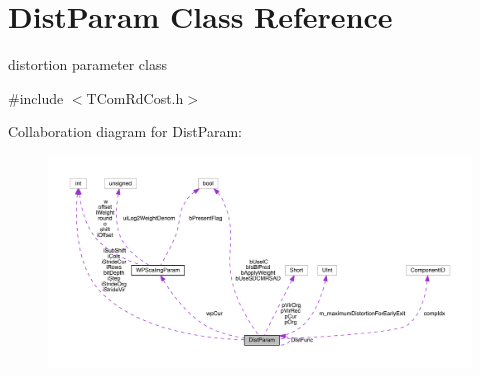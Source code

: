 \hypertarget{class_dist_param}{}\section{Dist\+Param Class Reference}
\label{class_dist_param}


distortion parameter class  




{\ttfamily \#include $<$T\+Com\+Rd\+Cost.\+h$>$}



Collaboration diagram for Dist\+Param\+:
\nopagebreak
\begin{figure}[H]
\begin{center}
\leavevmode
\includegraphics[width=350pt]{d0/d7f/class_dist_param__coll__graph}
\end{center}
\end{figure}
